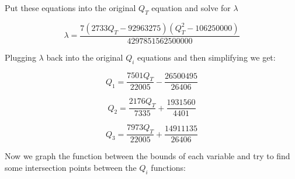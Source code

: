 \documentclass{report}
\begin{document}
Put these equations into the original $Q_T$ equation and solve for $\lambda$

$$\lambda = \frac{7\left(2733Q_T-92963275\right)\left(Q_T^2-106250000\right)}{4297851562500000}$$

Plugging $\lambda$ back into the original $Q_i$ equations and then simplifying we get:

$$Q_1 = \frac{7501Q_T}{22005}-\frac{26500495}{26406}$$

$$Q_2=\frac{2176Q_T}{7335}+\frac{1931560}{4401}$$

$$Q_3=\frac{7973Q_T}{22005}+\frac{14911135}{26406}$$

Now we graph the function between the bounds of each variable and try to find some intersection points between the $Q_i$ functions:

    
    
\end{document}
